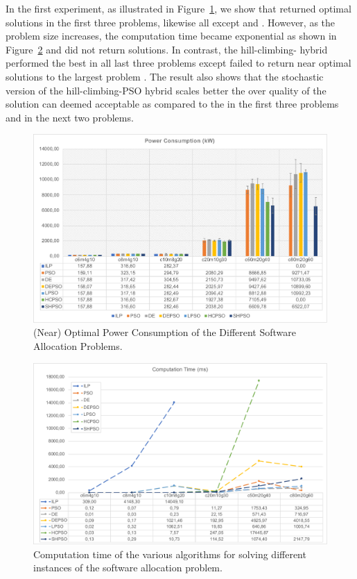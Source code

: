 In the first experiment, as illustrated in Figure~\ref{fig_powerconsumption_ilp_metaheuristic}, we show that \ilp returned optimal solutions in the first three problems, likewise all except \pso{} and \depso{}. However, as the problem size increases, the computation time became exponential as shown in Figure~\ref{fig_allocationtime_ilp_metaheuristic} and did not return solutions. In contrast, the hill-climbing-\pso{} hybrid performed the best in all last three problems except \hcpso{} failed to return near optimal solutions to the largest problem . The result also shows that the stochastic version of the hill-climbing-PSO hybrid \shpso{} scales better the over quality of the solution can deemed acceptable as compared to the \ilp{} in the first three problems and \hcpso{} in the next two problems. 
\begin{figure}
	\centering
	\includegraphics[width=0.8\linewidth]{images/power_consumption.pdf}
	\caption{(Near) Optimal Power Consumption of the Different Software Allocation Problems.}
	\label{fig_powerconsumption_ilp_metaheuristic}\vspace{-0.4cm}
\end{figure}

\begin{figure}
	\centering
	\includegraphics[width=0.8\linewidth]{images/time_summary.pdf}
	\caption{Computation time of the various algorithms for solving different instances of the software allocation problem.}
	\label{fig_allocationtime_ilp_metaheuristic}\vspace{-0.4cm}
\end{figure}


